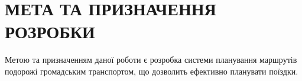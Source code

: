 \begingroup
\renewcommand{\cleardoublepage}{}
\renewcommand{\clearpage}{}
\chapter{МЕТА ТА ПРИЗНАЧЕННЯ РОЗРОБКИ}
\endgroup

\vspace{-\baselineskip}

Метою та призначенням даної роботи є розробка системи планування маршрутів подорожі громадським транспортом, що дозволить ефективно планувати поїздки.

\bigskip
\bigskip
\bigskip
\bigskip